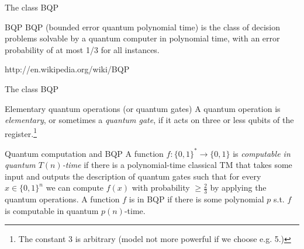 \documentclass[c]{beamer}
\begin{document}
\begin{frame}{The class BQP}
	\begin{block}{BQP}
		BQP (bounded error quantum polynomial time) is the class of decision problems solvable by a quantum computer in polynomial time, with an error probability of at most 1/3 for all instances.
	\end{block}
	http://en.wikipedia.org/wiki/BQP
\end{frame}

\begin{frame}{The class BQP}
	\begin{block}{Elementary quantum operations (or quantum gates)}
		A quantum operation is \emph{elementary}, or sometimes a \emph{quantum gate}, if it acts on three or less qubits of the register.\footnote{The constant 3 is arbitrary (model not more powerful if we choose e.g. 5.)}
	\end{block}
	
	\begin{block}{Quantum computation and BQP}
		A function $f:\{0,1\}^{*} \rightarrow \{0,1\}$ is \emph{computable in quantum $T(n)$-time} if there is a polynomial-time classical TM that takes some input and outputs the description of quantum gates such that for every $x \in \{0,1\}^{n}$ we can compute $f(x)$ with probability $\ge \frac{2}{3}$ by applying the quantum operations. A function $f$ is in BQP if there is some polynomial $p$ s.t. $f$ is computable in quantum $p(n)$-time.
	\end{block}
\end{frame}
\end{document}
